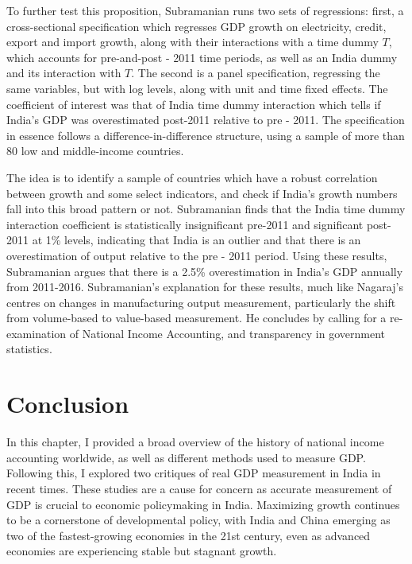 \documentclass[12pt,nobind, a4paper]{reedthesis}
\begin{document}
 To further test this proposition, Subramanian runs two sets of regressions: first, a cross-sectional specification which regresses GDP growth on electricity, credit, export and import growth, along with their interactions with a time dummy \(T\), which accounts for pre-and-post - 2011 time periods, as well as an India dummy and its interaction with \(T\). The second is a panel specification, regressing the same variables, but with log levels, along with unit and time fixed effects. The coefficient of interest was that of India time dummy interaction which tells if India's GDP was overestimated post-2011 relative to pre - 2011. The specification in essence follows a difference-in-difference structure, using a sample of more than 80 low and middle-income countries.
 \linebreak

 The idea is to identify a sample of countries which have a robust correlation between growth and some select indicators, and check if India's growth numbers fall into this broad pattern or not. Subramanian finds that the India time dummy interaction coefficient is statistically insignificant pre-2011 and significant post-2011 at 1\% levels, indicating that India is an outlier and that there is an overestimation of output relative to the pre - 2011 period. Using these results, Subramanian argues that there is a 2.5\% overestimation in India's GDP annually from 2011-2016. Subramanian's explanation for these results, much like Nagaraj's centres on changes in manufacturing output measurement, particularly the shift from volume-based to value-based measurement. He concludes by calling for a re-examination of National Income Accounting, and transparency in government statistics.

 \hypertarget{conclusion}{%
 \section{Conclusion}\label{conclusion}}

 In this chapter, I provided a broad overview of the history of national income accounting worldwide, as well as different methods used to measure GDP. Following this, I explored two critiques of real GDP measurement in India in recent times. These studies are a cause for concern as accurate measurement of GDP is crucial to economic policymaking in India. Maximizing growth continues to be a cornerstone of developmental policy, with India and China emerging as two of the fastest-growing economies in the 21st century, even as advanced economies are experiencing stable but stagnant growth.
 \linebreak
\end{document}
